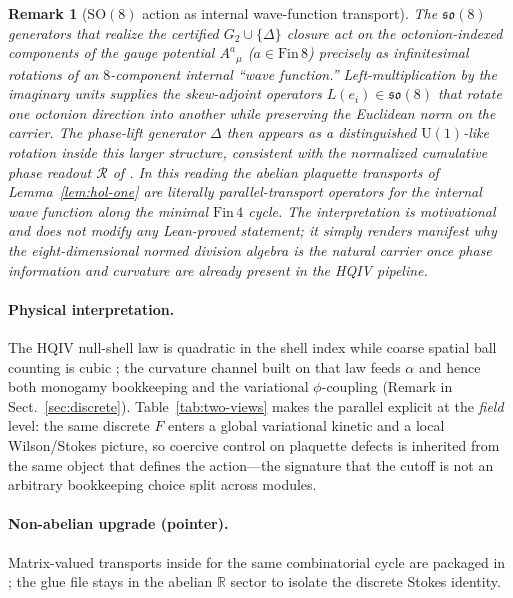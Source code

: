 \documentclass[11pt]{amsart}
\newtheorem{remark}[theorem]{Remark}
\begin{document}
\begin{remark}[\texorpdfstring{$\mathrm{SO}(8)$ action as internal wave-function transport}{SO8 wave-function transport}]
\label{rem:so8-wavefunction}
The \(\mathfrak{so}(8)\) generators that realize the certified \(G_2\cup\{\Delta\}\) closure act on the octonion-indexed components of the gauge potential \(A^a{}_\mu\) (\(a\in \mathrm{Fin}\,8\)) precisely as infinitesimal rotations of an \(8\)-component internal ``wave function.'' Left-multiplication by the imaginary units supplies the skew-adjoint operators \(L(e_i)\in\mathfrak{so}(8)\) that rotate one octonion direction into another while preserving the Euclidean norm on the carrier. The phase-lift generator \(\Delta\) then appears as a distinguished \(\mathrm{U}(1)\)-like rotation inside this larger structure, consistent with the normalized cumulative phase readout \(\mathcal{R}\) of \cite{hqiv-so8-paper}. In this reading the abelian plaquette transports of Lemma~\ref{lem:hol-one} are literally parallel-transport operators for the internal wave function along the minimal \(\mathrm{Fin}\,4\) cycle. The interpretation is motivational and does not modify any Lean-proved statement; it simply renders manifest why the eight-dimensional normed division algebra is the natural carrier once phase information and curvature are already present in the HQIV pipeline.
\end{remark}

\paragraph{Physical interpretation.}
The HQIV null-shell law is quadratic in the shell index while coarse spatial ball counting is cubic \cite{hqiv-3d-growth-paper}; the curvature channel built on that law feeds \(\alpha\) and hence both monogamy bookkeeping and the variational \(\phi\)-coupling (Remark in Sect.~\ref{sec:discrete}). Table~\ref{tab:two-views} makes the parallel explicit at the \emph{field} level: the same discrete \(F\) enters a global variational kinetic and a local Wilson/Stokes picture, so coercive control on plaquette defects is inherited from the same object that defines the action---the signature that the cutoff is not an arbitrary bookkeeping choice split across modules.

\paragraph{Non-abelian upgrade (pointer).}
Matrix-valued transports inside  for the same combinatorial cycle are packaged in ; the glue file stays in the abelian \(\mathbb{R}\) sector to isolate the discrete Stokes identity.
\end{document}
